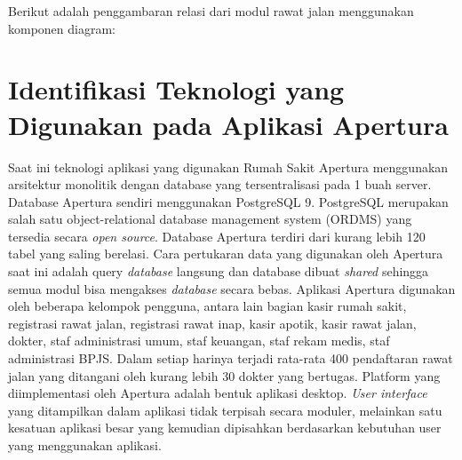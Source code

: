 Berikut adalah penggambaran relasi dari modul rawat jalan menggunakan komponen diagram:

\begin{adjustbox}{width=1\textwidth}
	\begin{minipage}{\linewidth}
	\end{minipage}
\end{adjustbox}

\section{Identifikasi Teknologi yang Digunakan pada Aplikasi Apertura}
Saat ini teknologi aplikasi yang digunakan Rumah Sakit Apertura menggunakan arsitektur monolitik dengan database yang tersentralisasi pada 1 buah server. Database Apertura sendiri menggunakan PostgreSQL 9. PostgreSQL merupakan salah satu object-relational database management system (ORDMS) yang tersedia secara \textit{open source}. Database Apertura terdiri dari kurang lebih 120 tabel yang saling berelasi. Cara pertukaran data yang digunakan oleh Apertura saat ini adalah query \textit{database} langsung dan database dibuat \textit{shared} sehingga semua modul bisa mengakses \textit{database} secara bebas.
Aplikasi Apertura digunakan oleh beberapa kelompok pengguna, antara lain bagian kasir rumah sakit, registrasi rawat jalan, registrasi rawat inap, kasir apotik, kasir rawat jalan, dokter, staf administrasi umum, staf keuangan, staf rekam medis, staf administrasi BPJS. Dalam setiap harinya terjadi rata-rata 400 pendaftaran rawat jalan yang ditangani oleh kurang lebih 30 dokter yang bertugas.
Platform yang diimplementasi oleh Apertura adalah bentuk aplikasi desktop. \textit{User interface} yang ditampilkan dalam aplikasi tidak terpisah secara moduler, melainkan satu kesatuan aplikasi besar yang kemudian dipisahkan berdasarkan kebutuhan user yang menggunakan aplikasi.

